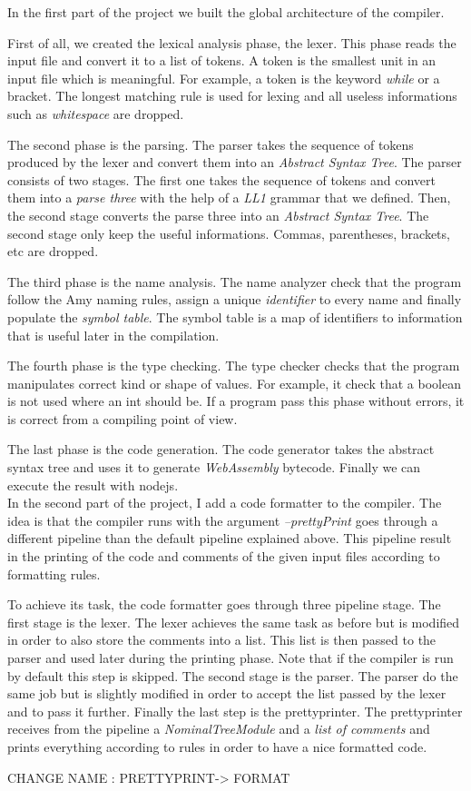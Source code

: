 In the first part of the project we built the global architecture of the compiler. 

First of all, we created the lexical analysis phase, the lexer. This phase reads the input file and convert it to a list of tokens. A token is the smallest unit in an input file which is meaningful. For example, a token is the keyword \emph{while} or a bracket. The longest matching rule is used for lexing and all useless informations such as \emph{whitespace} are dropped.

The second phase is the parsing. The parser takes the sequence of tokens produced by the lexer and convert them into an \emph{Abstract Syntax Tree}. The parser consists of two stages. The first one takes the sequence of tokens and convert them into a \emph{parse three} with the help of a \emph{LL1} grammar that we defined. Then, the second stage converts the parse three into an \emph{Abstract Syntax Tree}. The second stage only keep the useful informations. Commas, parentheses, brackets, etc are dropped.

The third phase is the name analysis. The name analyzer check that the program follow the Amy naming rules, assign a unique \emph{identifier} to every name and finally populate the \emph{symbol table}. The symbol table is a map of identifiers to information that is useful later in the compilation.

The fourth phase is the type checking. The type checker checks that the program manipulates correct kind or shape of values. For example, it check that a boolean is not used where an int should be. If a program pass this phase without errors, it is correct from a compiling point of view.

The last phase is the code generation. The code generator takes the abstract syntax tree and uses it to generate \emph{WebAssembly} bytecode. Finally we can execute the result with nodejs.\\

In the second part of the project, I add a code formatter to the compiler. The idea is that the compiler runs with the argument \emph{--prettyPrint} goes through a different pipeline than the default pipeline explained above. This pipeline result in the printing of the code and comments of the given input files according to formatting rules.

To achieve its task, the code formatter goes through three pipeline stage.
The first stage is the lexer. The lexer achieves the same task as before but is modified in order to also store the comments into a list. This list is then passed to the parser and used later during the printing phase. Note that if the compiler is run by default this step is skipped.
The second stage is the parser. The parser do the same job but is slightly modified in order to accept the list passed by the lexer and to pass it further. 
Finally the last step is the prettyprinter. The prettyprinter receives from the pipeline a \emph{NominalTreeModule} and a \emph{list of comments} and prints everything according to rules in order to have a nice formatted code.


CHANGE NAME : PRETTYPRINT-> FORMAT



